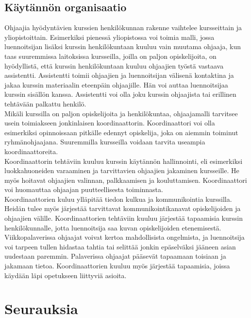 \documentclass[finnish]{tktltiki2}
\theoremstyle{definition}
\theoremstyle{remark}
\begin{document}
\subsection{Käytännön organisaatio}

Ohjaajia hyödyntävien kurssien henkilökunnan rakenne vaihtelee kursseittain ja yliopistoittain. Esimerkiksi pienessä yliopistossa voi toimia malli, jossa luennoitsijan lisäksi kurssin henkilökuntaan kuuluu vain muutama ohjaaja\cite{Dickson11}, kun taas suuremmissa laitoksissa kursseilla, joilla on paljon opiskelijoita, on hyödyllistä, että kurssin henkilökuntaan kuuluu ohjaajien työstä vastaava assistentti.\cite{Reges03} Assistentti toimii ohjaajien ja luennoitsijan välisenä kontaktina ja jakaa kurssin materiaalin eteenpäin ohjaajille. Hän voi auttaa luennoitsijaa kurssin sisällön kanssa. Assistentti voi olla joku kurssin ohjaajista tai erillinen tehtävään palkattu henkilö.
\\
Mikäli kurssilla on paljon opiskelijoita ja henkilökuntaa, ohjaajamalli tarvitsee usein toimiakseen jonkinlaisen koordinaattorin. Koordinaattori voi olla esimerkiksi opinnoissaan pitkälle edennyt opiskelija, joka on aiemmin toiminut ryhmänohjaajana. Suuremmilla kursseilla voidaan tarvita useampia koordinaattoreita.\cite{Roberts95}
\\
Koordinaattorin tehtäviin kuuluu kurssin käytännön hallinnointi, eli esimerkiksi luokkahuoneiden varaaminen ja tarvittavien ohjaajien jakaminen kursseille. He myös hoitavat ohjaajien valinnan, palkkaamisen ja kouluttamisen.\cite{Reges88,Roberts95} Koordinaattori voi huomauttaa ohjaajan puutteellisesta toiminnasta.\cite{Reges88}
\\
Koordinaattorien kuluu ylläpitää tiedon kulkua ja kommunikointia kurssilla. Heidän tulee myös järjestää tarvittavat kommunikointikanavat opiskelijoiden ja ohjaajien välille.\cite{Reges88} Koordinaattorien tehtäviin kuuluu järjestää tapaamisia kurssin henkilökunnalle, jotta luennoitsija saa kuvan opiskelijoiden etenemisestä. Viikkopalaverissa ohjaajat voivat kertoa mahdollisista ongelmista, ja luennoitsija voi tarpeen tullen hidastaa tahtia tai selittää jonkin epäselväksi jääneen asian uudestaan paremmin. Palaverissa ohjaajat pääsevät tapaamaan toisiaan ja jakamaan tietoa. Koordinaattorien kuuluu myös järjestää tapaamisia, joissa käydään läpi opetukseen liittyviä asioita.\cite{Reges88, Roberts95} 








\section{Seurauksia}
\end{document}
